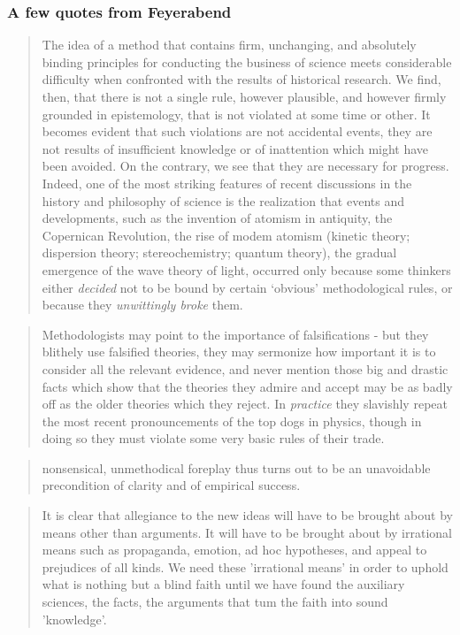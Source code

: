 \subsubsection{A few quotes from Feyerabend}

\begin{quote}
    The idea of a method that contains firm, unchanging, and
absolutely binding principles for conducting the business of science
meets considerable difficulty when confronted with the results of
historical research. We find, then, that there is not a single rule,
however plausible, and however firmly grounded in epistemology,
that is not violated at some time or other. It becomes evident that
such violations are not accidental events, they are not results of
insufficient knowledge or of inattention which might have been
avoided. On the contrary, we see that they are necessary for progress.
Indeed, one of the most striking features of recent
discussions in the history and philosophy of science is the
realization that events and developments, such as the invention of
atomism in antiquity, the Copernican Revolution, the rise of
modem atomism (kinetic theory; dispersion theory; stereochemistry;
quantum theory), the gradual emergence of the wave theory of
light, occurred only because some thinkers either \textit{decided} not to be
bound by certain `obvious' methodological rules, or because they
\textit{unwittingly broke} them. \citep[14]{feyerabend1993against}
\end{quote}

\begin{quote}
     Methodologists may point to the
importance of falsifications - but they blithely use falsified theories,
they may sermonize how important it is to consider all the relevant
evidence, and never mention those big and drastic facts which show
that the theories they admire and accept may be as badly off as the
older theories which they reject. In \textit{practice} they slavishly repeat the
most recent pronouncements of the top dogs in physics, though
in doing so they must violate some very basic rules of their trade.
 \citep[50]{feyerabend1993against}
\end{quote}


\begin{quote}
 nonsensical, unmethodical foreplay thus turns out
to be an unavoidable precondition of clarity and of empirical
success.    \citep[18]{feyerabend1993against}
\end{quote}

\begin{quote}
It is
clear that allegiance to the new ideas will have to be brought about by
means other than arguments. It will have to be brought about by
irrational means such as propaganda, emotion, ad hoc hypotheses, and
appeal to prejudices of all kinds. We need these 'irrational means' in
order to uphold what is nothing but a blind faith until we have found
the auxiliary sciences, the facts, the arguments that tum the faith into
sound 'knowledge'.
 \citep[114]{feyerabend1993against}
\end{quote}

